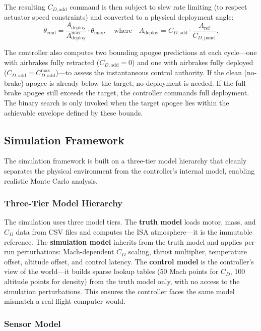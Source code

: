 \documentclass[11pt,letterpaper]{article}
\newcommand{\Cd}{C_D}
\newcommand{\Cdadd}{C_{D,\mathrm{add}}}
\newcommand{\Cdpanel}{C_{D,\mathrm{panel}}}
\newcommand{\Aref}{A_{\mathrm{ref}}}
\newcommand{\Adeploy}{A_{\mathrm{deploy}}}
\begin{document}
The resulting $\Cdadd$ command is then subject to slew rate limiting (to respect actuator speed constraints) and converted to a physical deployment angle:
\begin{equation}
    \theta_{\mathrm{cmd}} = \frac{\Adeploy}{\Adeploy^{\max}} \cdot \theta_{\max}, \quad \text{where} \quad \Adeploy = \Cdadd \cdot \frac{\Aref}{\Cdpanel}.
    \label{eq:angle_cmd}
\end{equation}

The controller also computes two bounding apogee predictions at each cycle---one with airbrakes fully retracted ($\Cdadd = 0$) and one with airbrakes fully deployed ($\Cdadd = \Cdadd^{\max}$)---to assess the instantaneous control authority. If the clean (no-brake) apogee is already below the target, no deployment is needed. If the full-brake apogee still exceeds the target, the controller commands full deployment. The binary search is only invoked when the target apogee lies within the achievable envelope defined by these bounds.


\subsection{Simulation Framework}
\label{sec:sim_framework}

The simulation framework is built on a three-tier model hierarchy that cleanly separates the physical environment from the controller's internal model, enabling realistic Monte Carlo analysis.

\subsubsection{Three-Tier Model Hierarchy}
\label{sec:truth_model}

The simulation uses three model tiers. The \textbf{truth model} loads motor, mass, and $\Cd$ data from CSV files and computes the ISA atmosphere---it is the immutable reference. The \textbf{simulation model} inherits from the truth model and applies per-run perturbations: Mach-dependent $\Cd$ scaling, thrust multiplier, temperature offset, altitude offset, and control latency. The \textbf{control model} is the controller's view of the world---it builds sparse lookup tables (50 Mach points for $\Cd$, 100 altitude points for density) from the truth model only, with no access to the simulation perturbations. This ensures the controller faces the same model mismatch a real flight computer would.

\subsubsection{Sensor Model}
\label{sec:sensor_model}
\end{document}
